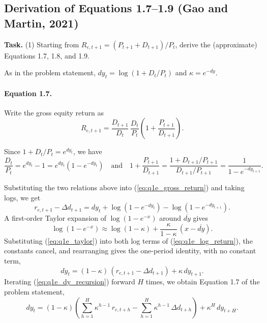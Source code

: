 \documentclass[11pt]{article}
\makeatletter
\newcommand{\dy}{\mathit{dy}}
\newcommand{\task}[1]{\par\if@nobreak\else\needspace{5\baselineskip}\fi\medskip\noindent
  \begin{minipage}{\linewidth}\textbf{Task.} #1\end{minipage}\par   %
  \nopagebreak\medskip\@afterheading}   %
\makeatother
\begin{document}
\subsection{Derivation of Equations 1.7--1.9 (Gao and Martin, 2021)}

\task{(1) Starting from $R_{e,t+1} = (P_{t+1} + D_{t+1})/P_t$, derive the (approximate)
Equations 1.7, 1.8, and 1.9.}

As in the problem statement, $\dy_t = \log(1 + D_t/P_t)$ and $\kappa = e^{-\overline{\dy}}$.

\paragraph{Equation 1.7.}
Write the gross equity return as
\begin{equation}
  R_{e,t+1} = \frac{D_{t+1}}{D_t}\,\frac{D_t}{P_t}\left(1 + \frac{P_{t+1}}{D_{t+1}}\right).
  \label{eq:q1e_gross_return}
\end{equation}

Since $1 + D_t/P_t = e^{dy_t}$, we have
\begin{equation}
  \frac{D_t}{P_t} = e^{dy_t} - 1 = e^{dy_t}\left(1 - e^{-dy_t}\right)
  \quad\text{and}\quad
  1 + \frac{P_{t+1}}{D_{t+1}}
  = \frac{1 + D_{t+1}/P_{t+1}}{D_{t+1}/P_{t+1}}
  = \frac{1}{1 - e^{-dy_{t+1}}}.
\end{equation}

\noindent Substituting the two relations above into (\ref{eq:q1e_gross_return}) and taking
logs, we get
\begin{equation}
  r_{e,t+1} - \Delta d_{t+1}
    = \dy_t + \log\!\left(1 - e^{-\dy_t}\right) - \log\!\left(1 - e^{-\dy_{t+1}}\right).
  \label{eq:q1e_log_return}
\end{equation}
A first-order Taylor expansion of $\log(1 - e^{-x})$ around $\overline{\dy}$ gives
\begin{equation}
  \log\!\left(1 - e^{-x}\right)
    \approx \log(1 - \kappa) + \frac{\kappa}{1 - \kappa}\,\left(x - \overline{\dy}\right).
  \label{eq:q1e_taylor}
\end{equation}
Substituting (\ref{eq:q1e_taylor}) into both log terms of (\ref{eq:q1e_log_return}), the
constants cancel, and rearranging gives the one-period identity, with no constant term,
\begin{equation}
  \dy_t = (1 - \kappa)\,\left(r_{e,t+1} - \Delta d_{t+1}\right) + \kappa\, \dy_{t+1}.
  \label{eq:q1e_dy_recursion}
\end{equation}
Iterating (\ref{eq:q1e_dy_recursion}) forward $H$ times, we obtain Equation 1.7 of the
problem statement,
\begin{equation}
  \dy_t = (1 - \kappa) \left( \sum_{h=1}^{H} \kappa^{h-1}\, r_{e,t+h}
          - \sum_{h=1}^{H} \kappa^{h-1}\, \Delta d_{t+h} \right)
          + \kappa^{H}\, \dy_{t+H}.
  \label{eq:q1e_H_step}
\end{equation}
\end{document}
